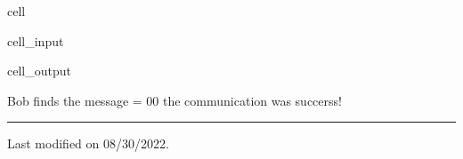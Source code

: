 \documentclass[letterpaper,10pt,english]{jupyterBook}
\begin{document}
\begin{sphinxuseclass}{cell}\begin{sphinxVerbatimInput}

\begin{sphinxuseclass}{cell_input}
\begin{sphinxVerbatim}[commandchars=\\\{\}]

 
    \PYG{p}{[}\PYG{p}{]}
       \PYG{p}{[}\PYG{p}{]}
\end{sphinxVerbatim}

\end{sphinxuseclass}\end{sphinxVerbatimInput}
\begin{sphinxVerbatimOutput}

\begin{sphinxuseclass}{cell_output}
\begin{sphinxVerbatim}[commandchars=\\\{\}]
Bob finds the message =  00
the communication was succerss!
\end{sphinxVerbatim}

\end{sphinxuseclass}\end{sphinxVerbatimOutput}

\end{sphinxuseclass}

\bigskip\hrule\bigskip


\sphinxAtStartPar
Last modified on 08/30/2022.

\sphinxstepscope
\end{document}
